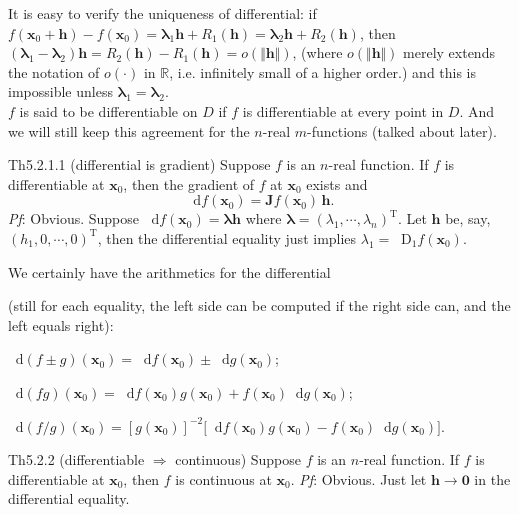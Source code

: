 \documentclass{article}
\newcommand{\dif}{\mathop{}\!\mathrm{d}}
\newcommand{\Dif}{\mathop{}\!\mathrm{D}}
\begin{document}
\begin{Rmk}{}
    It is easy to verify \textcolor{Th}{the uniqueness of differential:} if $f(\pmb{x}_0 + \pmb{h}) - f(\pmb{x}_0) = \pmb{\lambda}_1\pmb{h} + R_1(\pmb{h}) = \pmb{\lambda}_2\pmb{h} + R_2(\pmb{h})$, then $(\pmb{\lambda}_1 - \pmb{\lambda}_2)\pmb{h} = R_2(\pmb{h}) - R_1(\pmb{h}) = o(\Vert \pmb{h}\Vert)$, (\textcolor{Df}{where $o(\Vert \pmb{h}\Vert)$ merely extends the notation of $o(\cdot)$ in $\mathbb{R}$, i.e. infinitely small of a higher order.}) and this is impossible unless $\pmb{\lambda}_1 = \pmb{\lambda}_2$. \\
    \textcolor{Df}{$f$ is said to be differentiable on $D$ if $f$ is differentiable at every point in $D$. And we will still keep this agreement for the $n$-real $m$-functions (talked about later).}
\end{Rmk}

\begin{Th}{Th5.2.1.1 (differential is gradient)}
    Suppose $f$ is an $n$-real function. If $f$ is differentiable at $\pmb{x}_0$, then the gradient of $f$ at $\pmb{x}_0$ exists and
    $$\dif f(\pmb{x}_0) = \pmb{J}f(\pmb{x}_0)\,\pmb{h}.$$
    \tcblower
    \textit{Pf}: Obvious. Suppose $\dif f(\pmb{x}_0) = \pmb{\lambda h}$ where $\pmb{\lambda} = (\lambda_1, \cdots, \lambda_n)^\mathrm{T}$. Let $\pmb{h}$ be, say, $(h_1, 0, \cdots, 0)^\mathrm{T}$, then the differential equality just implies $\lambda_1 = \Dif_1 f(\pmb{x}_0)$.
\end{Th}

\begin{Rmk}{}
    We certainly have the arithmetics for the differential \textcolor{Th}{(still for each equality, the left side can be computed if the right side can, and the left equals right):
    \begin{compactenum}
        \item $\dif(f\pm g)(\pmb{x}_0) = \dif f(\pmb{x}_0)\pm\dif g(\pmb{x}_0)$;
        \item $\dif(fg)(\pmb{x}_0) = \dif f(\pmb{x}_0)g(\pmb{x}_0) + f(\pmb{x}_0)\dif g(\pmb{x}_0)$;
        \item $\dif(f/g)(\pmb{x}_0) = [g(\pmb{x}_0)]^{-2} \bigl[\dif f(\pmb{x}_0)g(\pmb{x}_0) - f(\pmb{x}_0)\dif g(\pmb{x}_0)\bigr]$.
    \end{compactenum}
    }
\end{Rmk}

\begin{Th}{Th5.2.2 (differentiable $\Rightarrow$ continuous)}
    Suppose $f$ is an $n$-real function. If $f$ is differentiable at $\pmb{x}_0$, then $f$ is continuous at $\pmb{x}_0$.
    \tcblower
    \textit{Pf}: Obvious. Just let $\pmb{h}\rightarrow \pmb{0}$ in the differential equality.
\end{Th}
\end{document}
